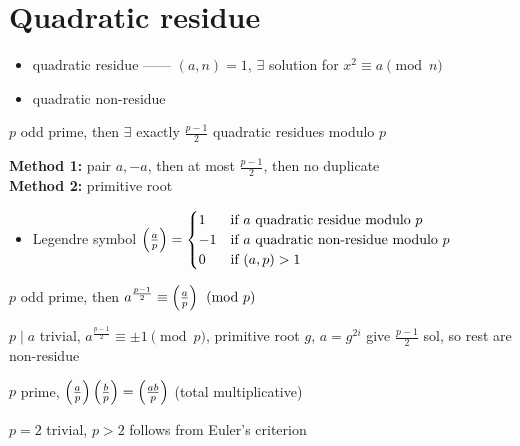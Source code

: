 \section{Quadratic residue}\label{sec:quadratic-residue}

\begin{itemize}
    \item quadratic residue ------ $(a, n) = 1$, $\exists$ solution for $x^2 \equiv a \pmod{n}$
    \item quadratic non-residue
\end{itemize}

\begin{lemma}
    $p$ odd prime, then $\exists$ exactly $\frac{p-1}{2}$ quadratic residues modulo $p$
\end{lemma}
\begin{pf}
    \textbf{Method 1:} pair $a, -a$, then at most $\frac{p-1}{2}$, then no duplicate\\
    \textbf{Method 2:} primitive root
\end{pf}

\begin{itemize}
    \item Legendre symbol $\left( \frac{a}{p} \right) = \begin{cases}
                                              1 & \text{if } a \text{ quadratic residue modulo } p\\
                                              -1 & \text{if } a \text{ quadratic non-residue modulo } p\\
                                              0 & \text{if } (a, p) > 1
    \end{cases}$
\end{itemize}

\begin{thm}
    $p$ odd prime, then $a^{\frac{p-1}{2}} \equiv \left( \frac{a}{p} \right) \pmod{p}$
\end{thm}
\begin{pf}
    $p\mid a$ trivial, $a^{\frac{p-1}{2}} \equiv \pm 1 \pmod{p}$, primitive root $g$, $a = g^{2i}$ give $\frac{p-1}{2}$ sol, so rest are non-residue
\end{pf}

\begin{cor}
    $p$ prime, $\left( \frac{a}{p} \right) \left( \frac{b}{p} \right) = \left( \frac{ab}{p} \right)$ (total multiplicative)
\end{cor}
\begin{pf}
    $p = 2$ trivial, $p > 2$ follows from Euler's criterion
\end{pf}

